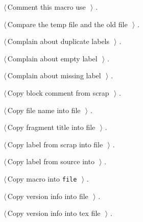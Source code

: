 \documentclass[a4paper]{report}
\begin{document}
{\begin{list}{}{\setlength{\itemsep}{-\parsep}\setlength{\itemindent}{-\leftmargin}}
\item $\langle\,$Comment this macro use\nobreak\ {\footnotesize {}}$\,\rangle$ {\footnotesize {\NWtxtRefIn} .
}
\item $\langle\,$Compare the temp file and the old file\nobreak\ {\footnotesize {}}$\,\rangle$ {\footnotesize {\NWtxtRefIn} .}
\item $\langle\,$Complain about duplicate labels\nobreak\ {\footnotesize {}}$\,\rangle$ {\footnotesize {\NWtxtRefIn} .}
\item $\langle\,$Complain about empty label\nobreak\ {\footnotesize {}}$\,\rangle$ {\footnotesize {\NWtxtRefIn} .}
\item $\langle\,$Complain about missing label\nobreak\ {\footnotesize {}}$\,\rangle$ {\footnotesize {\NWtxtRefIn} .}
\item $\langle\,$Copy block comment from scrap\nobreak\ {\footnotesize {}}$\,\rangle$ {\footnotesize {\NWtxtRefIn} .}
\item $\langle\,$Copy file name into file\nobreak\ {\footnotesize {}}$\,\rangle$ {\footnotesize {\NWtxtRefIn} .}
\item $\langle\,$Copy fragment title into file\nobreak\ {\footnotesize {}}$\,\rangle$ {\footnotesize {\NWtxtRefIn} .}
\item $\langle\,$Copy label from scrap into file\nobreak\ {\footnotesize {}}$\,\rangle$ {\footnotesize {\NWtxtRefIn} .}
\item $\langle\,$Copy label from source into\nobreak\ {\footnotesize {}}$\,\rangle$ {\footnotesize {\NWtxtRefIn} .
}
\item $\langle\,$Copy macro into \verb|file|\nobreak\ {\footnotesize {}}$\,\rangle$ {\footnotesize {\NWtxtRefIn} .}
\item $\langle\,$Copy version info into file\nobreak\ {\footnotesize {}}$\,\rangle$ {\footnotesize {\NWtxtRefIn} .
}
\item $\langle\,$Copy version info into tex file\nobreak\ {\footnotesize {}}$\,\rangle$ {\footnotesize {\NWtxtRefIn} .}

\end{list}}
\end{document}
